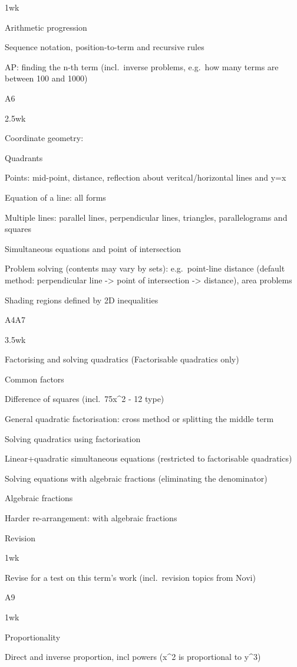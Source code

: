 \documentclass[
]{article}
\begin{document}
1wk

Arithmetic progression

Sequence notation, position-to-term and recursive rules

AP: finding the n-th term (incl.~inverse problems, e.g.~how many terms
are between 100 and 1000)

A6

2.5wk

Coordinate geometry:

Quadrants

Points: mid-point, distance, reflection about veritcal/horizontal lines
and y=x

Equation of a line: all forms

Multiple lines: parallel lines, perpendicular lines, triangles,
parallelograms and squares

Simultaneous equations and point of intersection

Problem solving (contents may vary by sets): e.g.~point-line distance
(default method: perpendicular line -\textgreater{} point of
intersection -\textgreater{} distance), area problems

Shading regions defined by 2D inequalities

A4A7

3.5wk

Factorising and solving quadratics (Factorisable quadratics only)

Common factors

Difference of squares (incl.~75x\^{}2 - 12 type)

General quadratic factorisation: cross method or splitting the middle
term

Solving quadratics using factorisation

Linear+quadratic simultaneous equations (restricted to factorisable
quadratics)

Solving equations with algebraic fractions (eliminating the denominator)

Algebraic fractions

Harder re-arrangement: with algebraic fractions

Revision

1wk

Revise for a test on this term's work (incl.~revision topics from Novi)

A9

1wk

Proportionality

Direct and inverse proportion, incl powers (x\^{}2 is proportional to
y\^{}3)
\end{document}

